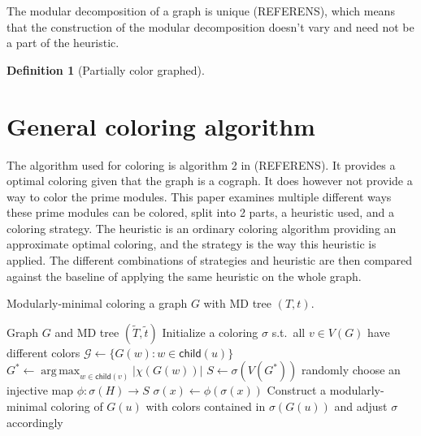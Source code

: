 \documentclass{amsart}
\newtheorem{definition}{Definition}[section]
\newcommand{\child}{\mathsf{child}}
\DeclareMathOperator*{\argmax}{arg\,max}
\newcommand{\T}{\widetilde{T}}
\renewcommand{\t}{\widetilde{t}}
\begin{document}
The modular decomposition of a graph is unique (REFERENS), which means that the
construction of the modular decomposition doesn't vary and need not be a part of
the heuristic.


\begin{definition}[Partially color graphed]


\end{definition}

\section{General coloring algorithm}

The algorithm used for coloring is algorithm 2 in (REFERENS). It provides a
optimal coloring given that the graph is a cograph. It does however not
provide a way to color the prime modules. This paper examines multiple different
ways these prime modules can be colored, split into 2 parts, a heuristic used,
and a coloring strategy. The heuristic is an ordinary coloring algorithm
providing an approximate optimal coloring, and the strategy is the way this
heuristic is applied. The different combinations of strategies and heuristic are
then compared against the baseline of applying the same heuristic on the whole
graph.

\begin{algorithm}[t]
  \caption{Modularly-minimal coloring a graph $G$ with MD tree $(T,t)$.}
  \label{alg:modmin}
  \begin{algorithmic}[1]
    \REQUIRE Graph $G$ and MD tree $(\T,\t)$
    \STATE Initialize a coloring $\sigma$ s.t.\ all $v \in V(G)$
           have different colors
          \STATE $\mathcal{G} \leftarrow \{G(w)\colon w\in\child(u)\}$ 
          \STATE $G^* \leftarrow \argmax_{w\in\child(v)} |\chi(G(w))|$
          \STATE $S \leftarrow \sigma(V(G^*))$ 
             \STATE randomly choose an injective map $\phi:\sigma(H)\to S$
                \STATE $\sigma(x)\leftarrow \phi(\sigma(x))$  
             \ENDFOR
          \ENDFOR
          \STATE Construct a modularly-minimal coloring of $G(u)$
              with colors contained in $\sigma(G(u))$
              and adjust $\sigma$ accordingly \label{alg:prime-color}
       \ENDIF
    \ENDFOR
  \end{algorithmic}
\end{algorithm}
\end{document}
